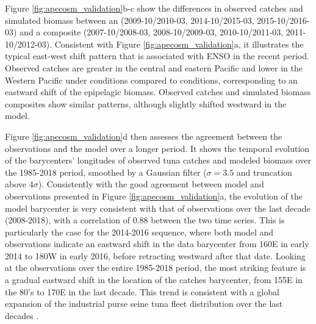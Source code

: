 Figure \ref{fig:apecosm_validation}b-c show the differences in observed catches and simulated biomass between an \nino{} (2009-10/2010-03, 2014-10/2015-03, 2015-10/2016-03) and a \nina{} composite (2007-10/2008-03, 2008-10/2009-03, 2010-10/2011-03, 2011-10/2012-03). Consistent with Figure \ref{fig:apecosm_validation}a, it illustrates the typical east-west shift pattern that is associated with ENSO in the recent period. 
Observed catches are greater in the central and eastern Pacific and lower in the Western Pacific under \nino{} conditions compared to \nina{} conditions, corresponding to an eastward shift of the epipelagic biomass. Observed catches and simulated biomass composites show similar patterns, although slightly shifted westward in the model.

Figure \ref{fig:apecosm_validation}d then assesses the agreement between the observations and the model over a longer period. It shows the temporal evolution of the barycenters' longitudes of observed tuna catches and modeled biomass over the 1985-2018 period, smoothed by a Gaussian filter ($\sigma=3.5$ and truncation above $4\sigma$). Consistently with the good agreement between model and observations presented in Figure \ref{fig:apecosm_validation}a, the evolution of the model barycenter  is very consistent with that of observations over the last decade (2008-2018), with a correlation of 0.88 between the two time series. This is particularly the case for the 2014-2016 \nino{} sequence, where both model and observations indicate an eastward shift in the data barycenter from 160\degree{}E in early 2014 to 180\degree{}W in early 2016, before retracting westward after that date. Looking at the observations over the entire 1985-2018 period, the most striking feature is a gradual eastward shift in the location of the catches barycenter, from 155\degree{}E in the 80's to 170\degree{}E in the last decade. This trend is consistent with a global expansion of the industrial purse seine tuna fleet distribution over the last decades \citep{coulterUsingHarmonizedHistorical2020}. 

